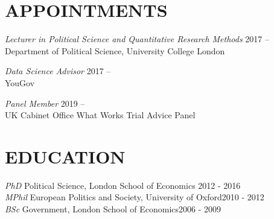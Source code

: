 \documentclass[centered]{res}
\begin{document}
 
\address{Department of Political Science \\ University College London\\ Gower Street \\ London \\ WC1E 6BT }

\address{\faEnvelope \hfil \textcolor{white}{hi}\href{mailto:j.blumenau@ucl.ac.uk}{j.blumenau@ucl.ac.uk} \\ \faHome \hfil\href{http://www.jackblumenau.com}{jackblumenau.com}\\ \faTwitter \hfil \href{http://www.twitter.com/jblumenau}{@jblumenau}}

 
\begin{resume}

\section{APPOINTMENTS} 
{\sl Lecturer in Political Science and Quantitative Research Methods} \hfill 2017 --\\
Department of Political Science, University College London

{\sl Data Science Advisor} \hfill 2017 --\\
YouGov

{\sl Panel Member} \hfill 2019 --\\
UK Cabinet Office What Works Trial Advice Panel


\section{EDUCATION} 

		{\sl PhD} Political Science, London School of Economics \hfill 2012 - 2016\\
		{\sl MPhil} European Politics and Society, University of Oxford\hfill 2010 - 2012 \\
		{\sl BSc} Government, London School of Economics\hfill 2006 - 2009 


\end{resume}
\end{document}
